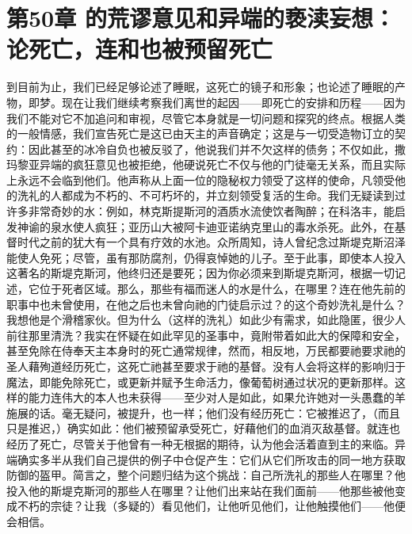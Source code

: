 
\section{第50章 的荒谬意见和异端的亵渎妄想：论死亡，连和也被预留死亡}

到目前为止，我们已经足够论述了睡眠，这死亡的镜子和形象；也论述了睡眠的产物，即梦。现在让我们继续考察我们离世的起因——即死亡的安排和历程——因为我们不能对它不加追问和审视，尽管它本身就是一切问题和探究的终点。根据人类的一般情感，我们宣告死亡是这已由天主的声音确定；这是与一切受造物订立的契约：因此甚至的冰冷自负也被反驳了，他说我们并不欠这样的债务；不仅如此，撒玛黎亚异端的疯狂意见也被拒绝，他硬说死亡不仅与他的门徒毫无关系，而且实际上永远不会临到他们。他声称从上面一位的隐秘权力领受了这样的使命，凡领受他的洗礼的人都成为不朽的、不可朽坏的，并立刻领受复活的生命。我们无疑读到过许多非常奇妙的水：例如，林克斯提斯河的酒质水流使饮者陶醉；在科洛丰，能启发神谕的泉水使人疯狂；亚历山大被阿卡迪亚诺纳克里山的毒水杀死。此外，在基督时代之前的犹大有一个具有疗效的水池。众所周知，诗人曾纪念过斯堤克斯沼泽能使人免死；尽管，虽有那防腐剂，仍得哀悼她的儿子。至于此事，即使本人投入这著名的斯堤克斯河，他终归还是要死；因为你必须来到斯堤克斯河，根据一切记述，它位于死者区域。那么，那些有福而迷人的水是什么，在哪里？连在他先前的职事中也未曾使用，在他之后也未曾向祂的门徒启示过？的这个奇妙洗礼是什么？我想他是个滑稽家伙。但为什么（这样的洗礼）如此少有需求，如此隐匿，很少人前往那里清洗？我实在怀疑在如此罕见的圣事中，竟附带着如此大的保障和安全，甚至免除在侍奉天主本身时的死亡通常规律，然而，相反地，万民都要祂要求祂的圣人藉殉道经历死亡，这死亡祂甚至要求于祂的基督。没有人会将这样的影响归于魔法，即能免除死亡，或更新并赋予生命活力，像葡萄树通过状况的更新那样。这样的能力连伟大的本人也未获得——至少对人是如此，如果允许她对一头愚蠢的羊施展的话。毫无疑问，被提升，也一样；他们没有经历死亡：它被推迟了，（而且只是推迟，）确实如此：他们被预留承受死亡，好藉他们的血消灭敌基督。就连也经历了死亡，尽管关于他曾有一种无根据的期待，认为他会活着直到主的来临。异端确实多半从我们自己提供的例子中仓促产生：它们从它们所攻击的同一地方获取防御的盔甲。简言之，整个问题归结为这个挑战：自己所洗礼的那些人在哪里？他投入他的斯堤克斯河的那些人在哪里？让他们出来站在我们面前——他那些被他变成不朽的宗徒？让我（多疑的）看见他们，让他听见他们，让他触摸他们——他便会相信。\par

